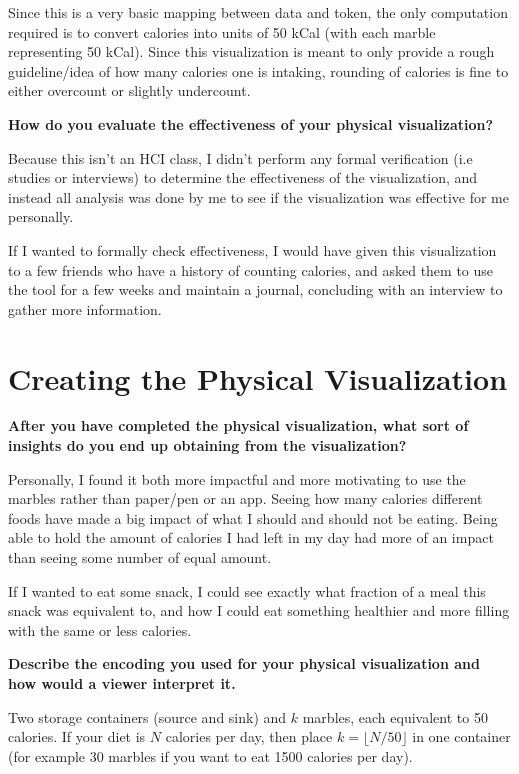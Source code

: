 \documentclass{article}
\begin{document}
Since this is a very basic mapping between data and token, the only computation required is to convert calories into units of 50 kCal (with each marble representing 50 kCal). Since this visualization is meant to only provide a rough guideline/idea of how many calories one is intaking, rounding of calories is fine to either overcount or slightly undercount. 

\textbf{How do you evaluate the effectiveness of your physical visualization?}

Because this isn't an HCI class, I didn't perform any formal verification (i.e studies or interviews) to determine the effectiveness of the visualization, and instead all analysis was done by me to see if the visualization was effective for me personally. 

If I wanted to formally check effectiveness, I would have given this visualization to a few friends who have a history of counting calories, and asked them to use the tool for a few weeks and maintain a journal, concluding with an interview to gather more information. 



\section{Creating the Physical Visualization}

\textbf{After you have completed the physical visualization, what sort of insights do you end up obtaining from the visualization?}

Personally, I found it both more impactful and more motivating to use the marbles rather than paper/pen or an app. Seeing how many calories different foods have made a big impact of what I should and should not be eating. Being able to hold the amount of calories I had left in my day had more of an impact than seeing some number of equal amount. 

If I wanted to eat some snack, I could see exactly what fraction of a meal this snack was equivalent to, and how I could eat something healthier and more filling with the same or less calories. 

\textbf{Describe the encoding you used for your physical visualization and how would a viewer interpret it.}

Two storage containers (source and sink) and $k$ marbles, each equivalent to 50 calories. If your diet is $N$ calories per day, then place $k = \lfloor N/50\rfloor$ in one container (for example 30 marbles if you want to eat 1500 calories per day).
\end{document}
